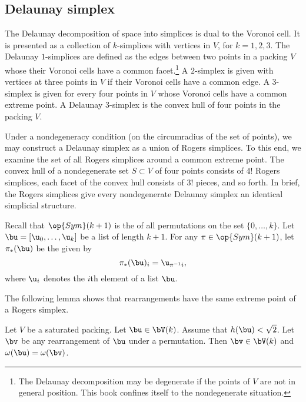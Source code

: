 \subsection{Delaunay simplex}

The Delaunay decomposition of space into simplices is dual to the
Voronoi cell.  It is presented as a collection of $k$-simplices with
vertices in $V$, for $k=1,2,3$.  The Delaunay $1$-simplices are
defined as the edges between two points in a packing $V$ whose their
Voronoi cells have a common facet.\footnote{The Delaunay decomposition
  may be degenerate if the points of $V$ are not in general position.
  This book confines itself to the nondegenerate situation.}  A
$2$-simplex is given with vertices at three points in $V$ if their
Voronoi cells have a common edge.  A $3$-simplex is given for every
four points in $V$ whose Voronoi cells have a common extreme point.  A
Delaunay $3$-simplex is the convex hull of four points in the packing
$V$.

Under a nondegeneracy condition (on the circumradius of the set of
points), we may construct a Delaunay simplex as a union of Rogers
simplices.  To this end, we examine the set of all Rogers simplices
around a common extreme point.  The convex hull of a nondegenerate set
$S\subset V$ of four points consists of $4!$ Rogers simplices,  each
facet of the convex hull consists of $3!$ pieces,  and so
forth.  In brief, the Rogers simplices give every nondegenerate
Delaunay simplex an identical simplicial structure.


Recall that $\op{Sym}(k+1)$ is the  of all permutations
on the set $\{0,\ldots,k\}$.  Let $\bu = [\u_0,\ldots, \u_k]$ be a
list of length $k+1$.  For any 
$\pi\in\op{Sym}(k+1)$, let $\pi_*(\bu)$ be the 
given by
\[  
\pi_*(\bu)_i =  \u_{\pi^{-1} i}, %
\]    
where $\u_i$ denotes the $i$th element of a list $\bu$.
%
%

The following lemma shows that rearrangements have the same extreme
point of a Rogers simplex.

\begin{lemma}
\label{lemma:perm-Vk} 
  Let $V$ be a saturated packing.  Let $\bu\in \bV(k)$.  Assume that
  $h(\bu)<\sqrt2$. Let $\bv$ be any rearrangement of $\bu$ under a
  permutation.  Then $\bv\in \bV(k)$ and $\omega(\bu) = \omega(\bv)$.
\end{lemma}

